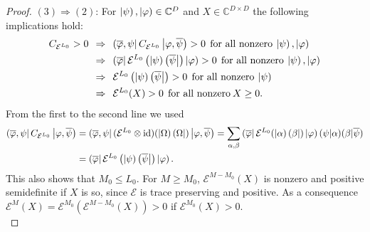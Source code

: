 \begin{proof}
\noindent $(3) \Rightarrow (2)$: For $\left| \psi \right), \left| \varphi \right) \in \mathbb{C}^D$ and $X \in \mathbb{C}^{D \times D}$ the following implications hold:
\begin{align}
\begin{split}
C_{\mathcal{E}^{L_0}}>0 &\:\:\Rightarrow\:\: \left( \overline{\varphi}, \psi \right| C_{\mathcal{E}^{L_0}} \left| \varphi,\overline{\psi} \right) > 0 \:\:\text{for all nonzero}\: \left| \psi \right), \left| \varphi \right) \\
&\:\:\Rightarrow\:\: \left( \overline{\varphi} \right| \mathcal{E}^{L_0} \left( \left| \psi \right)\left( \overline{\psi} \right| \right) \left| \varphi \right) > 0 \:\:\text{for all nonzero}\: \left| \psi \right),\left| \varphi \right) \\
&\:\:\Rightarrow\:\: \mathcal{E}^{L_0} \left( \left| \psi \right)\left( \overline{\psi} \right| \right) > 0 \:\:\text{for all nonzero}\: \left| \psi \right) \\
&\:\:\Rightarrow\:\: \mathcal{E}^{L_0}(X) > 0 \:\:\text{for all nonzero}\: X\geq0.
\end{split}
\end{align}
From the first to the second line we used 
\begin{align}
\begin{split}
\left( \overline{\varphi},\psi \right| C_{\mathcal{E}^{L_0}} \left| \varphi,\overline{\psi} \right) 
&= \left( \overline{\varphi},\psi \right| (\mathcal{E}^{L_0}\otimes\mathrm{id})(\left| \Omega \right)\left( \Omega \right|) \left| \varphi,\overline{\psi} \right) 
= \sum_{\alpha,\beta} \left( \overline{\varphi} \right| \mathcal{E}^{L_0}(\left| \alpha \right)\left( \beta \right|)\left| \varphi \right) ( \psi \vert \alpha ) ( \beta \vert \overline{\psi} ) \\
&= \left( \overline{\varphi} \right| \mathcal{E}^{L_0} \left( \left| \psi \right)\left( \overline{\psi} \right| \right) \left| \varphi \right).
\end{split}
\end{align}
This also shows that $M_0 \leq L_0$. For $M \geq M_0$, $\mathcal{E}^{M-M_0}(X)$ is nonzero and positive semidefinite if $X$ is so, since $\mathcal{E}$ is trace preserving and positive. As a consequence $\mathcal{E}^{M}(X) = \mathcal{E}^{M_0}(\mathcal{E}^{M-M_0}(X)) > 0$ if $\mathcal{E}^{M_0}(X) > 0$. \\


\end{proof}
